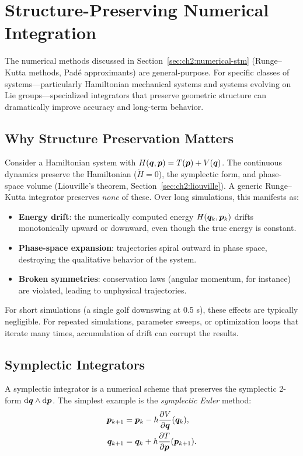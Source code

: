 \section{Structure-Preserving Numerical Integration}

The numerical methods discussed in Section~\ref{sec:ch2:numerical-stm} (Runge--Kutta
methods, Padé approximants) are general-purpose. For specific classes of systems---particularly
Hamiltonian mechanical systems and systems evolving on Lie groups---specialized integrators
that preserve geometric structure can dramatically improve accuracy and long-term behavior.

\subsection{Why Structure Preservation Matters}

Consider a Hamiltonian system with $H(\bm{q}, \bm{p}) = T(\bm{p}) + V(\bm{q})$. The continuous
dynamics preserve the Hamiltonian ($\dot{H} = 0$), the symplectic form, and phase-space
volume (Liouville's theorem, Section~\ref{sec:ch2:liouville}). A generic Runge--Kutta
integrator preserves \emph{none} of these. Over long simulations, this manifests as:
\begin{itemize}
\item \textbf{Energy drift}: the numerically computed energy $H(\bm{q}_k, \bm{p}_k)$ drifts
      monotonically upward or downward, even though the true energy is constant.
\item \textbf{Phase-space expansion}: trajectories spiral outward in phase space,
      destroying the qualitative behavior of the system.
\item \textbf{Broken symmetries}: conservation laws (angular momentum, for instance)
      are violated, leading to unphysical trajectories.
\end{itemize}

For short simulations (a single golf downswing at 0.5 s), these effects are typically
negligible. For repeated simulations, parameter sweeps, or optimization loops that
iterate many times, accumulation of drift can corrupt the results.

\subsection{Symplectic Integrators}

A symplectic integrator is a numerical scheme that preserves the symplectic 2-form
$\mathrm{d}\bm{q} \wedge \mathrm{d}\bm{p}$. The simplest example is the \emph{symplectic Euler} method:
\begin{align}
\bm{p}_{k+1} &= \bm{p}_k - h \frac{\partial V}{\partial \bm{q}}(\bm{q}_k), \label{eq:ch2:symplectic-euler-p} \\
\bm{q}_{k+1} &= \bm{q}_k + h \frac{\partial T}{\partial \bm{p}}(\bm{p}_{k+1}). \label{eq:ch2:symplectic-euler-q}
\end{align}

